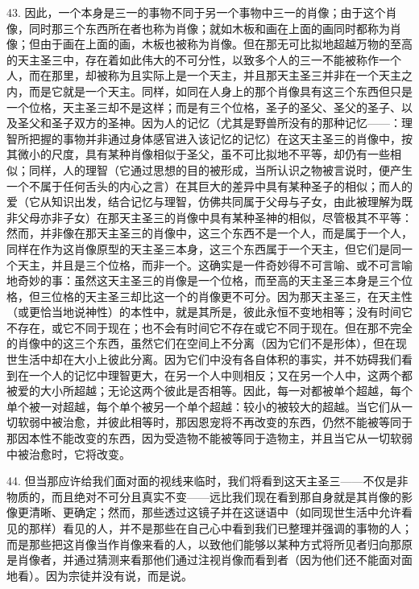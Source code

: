 43. 因此，一个本身是三一的事物不同于另一个事物中三一的肖像；由于这个肖像，同时那三个东西所在者也称为肖像；就如木板和画在上面的画同时都称为肖像；但由于画在上面的画，木板也被称为肖像。但在那无可比拟地超越万物的至高的天主圣三中，存在着如此伟大的不可分性，以致多个人的三一不能被称作一个人，而在那里，却被称为且实际上是一个天主，并且那天主圣三并非在一个天主之内，而是它就是一个天主。同样，如同在人身上的那个肖像具有这三个东西但只是一个位格，天主圣三却不是这样；而是有三个位格，圣子的圣父、圣父的圣子、以及圣父和圣子双方的圣神。因为人的记忆（尤其是野兽所没有的那种记忆——：理智所把握的事物并非通过身体感官进入该记忆的记忆）在这天主圣三的肖像中，按其微小的尺度，具有某种肖像相似于圣父，虽不可比拟地不平等，却仍有一些相似；同样，人的理智（它通过思想的目的被形成，当所认识之物被言说时，便产生一个不属于任何舌头的内心之言）在其巨大的差异中具有某种圣子的相似；而人的爱（它从知识出发，结合记忆与理智，仿佛共同属于父母与子女，由此被理解为既非父母亦非子女）在那天主圣三的肖像中具有某种圣神的相似，尽管极其不平等：然而，并非像在那天主圣三的肖像中，这三个东西不是一个人，而是属于一个人，同样在作为这肖像原型的天主圣三本身，这三个东西属于一个天主，但它们是同一个天主，并且是三个位格，而非一个。这确实是一件奇妙得不可言喻、或不可言喻地奇妙的事：虽然这天主圣三的肖像是一个位格，而至高的天主圣三本身是三个位格，但三位格的天主圣三却比这一个的肖像更不可分。因为那天主圣三，在天主性（或更恰当地说神性）的本性中，就是其所是，彼此永恒不变地相等；没有时间它不存在，或它不同于现在；也不会有时间它不存在或它不同于现在。但在那不完全的肖像中的这三个东西，虽然它们在空间上不分离（因为它们不是形体），但在现世生活中却在大小上彼此分离。因为它们中没有各自体积的事实，并不妨碍我们看到在一个人的记忆中理智更大，在另一个人中则相反；又在另一个人中，这两个都被爱的大小所超越；无论这两个彼此是否相等。因此，每一对都被单个超越，每个单个被一对超越，每个单个被另一个单个超越：较小的被较大的超越。当它们从一切软弱中被治愈，并彼此相等时，那因恩宠将不再改变的东西，仍然不能被等同于那因本性不能改变的东西，因为受造物不能被等同于造物主，并且当它从一切软弱中被治愈时，它将改变。\par

44. 但当那应许给我们面对面的视线来临时，我们将看到这天主圣三——不仅是非物质的，而且绝对不可分且真实不变——远比我们现在看到那自身就是其肖像的影像更清晰、更确定；然而，那些透过这镜子并在这谜语中（如同现世生活中允许看见的那样）看见的人，并不是那些在自己心中看到我们已整理并强调的事物的人；而是那些把这肖像当作肖像来看的人，以致他们能够以某种方式将所见者归向那原是肖像者，并通过猜测来看那他们通过注视肖像而看到者（因为他们还不能面对面地看）。因为宗徒并没有说，而是说。\par

